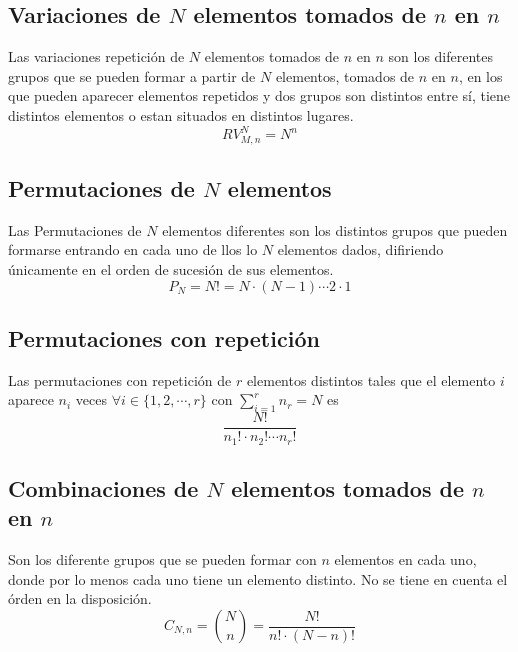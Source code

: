 \subsection{Variaciones de $N$ elementos tomados de $n$ en $n$}

\begin{defn} 
  Las variaciones repetición de $N$ elementos tomados de $n$ en $n$ son los diferentes grupos que se pueden formar a partir de $N$ elementos, tomados de $n$ en $n$, en los que pueden aparecer elementos repetidos y dos grupos son distintos entre sí, tiene distintos elementos o estan situados en distintos lugares.
  \[ 
    RV_{M,n}^{N} = N^n
  \] 
\end{defn}

\subsection{Permutaciones de $N$ elementos}

\begin{defn}[Permutación]
  Las Permutaciones de $N$ elementos diferentes son los distintos grupos que pueden formarse entrando en cada uno de llos lo $N$ elementos dados, difiriendo únicamente en el orden de sucesión de sus elementos.
  \[ 
    P_{N} = N! = N \cdot (N-1) \cdots 2 \cdot 1 
  \]  
\end{defn}

\subsection{Permutaciones con repetición}

\begin{defn}
  Las permutaciones con repetición de $r$ elementos distintos tales que el elemento $i$ aparece $n_{i}$ veces $\forall i \in \{ 1, 2, \cdots, r \}$ con $ \sum_{i = 1}^{r} n_{r} = N$ es
  \[ 
    \frac{N!}{n_{1}! \cdot n_{2}! \cdots n_{r}!} 
  \] 
\end{defn}

\subsection{Combinaciones de $N$ elementos tomados de $n$ en $n$}

\begin{defn}
  Son los diferente grupos que se pueden formar con $n$ elementos en cada uno, donde por lo menos cada uno tiene un elemento distinto. No se tiene en cuenta el órden en la disposición.
  \[ 
    C_{N,n} = \binom{N}{n} = \frac{N!}{n! \cdot (N-n)!}
  \] 
\end{defn}

